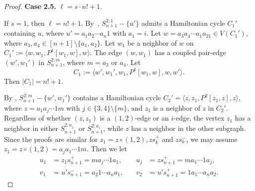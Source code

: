 \documentclass[12pt,a4paper]{amsart}
\theoremstyle{definition}
\begin{document}
\begin{proof}
%

\textbf{Case 2.5.} $\ell=s\cdot n!+1$.

If $s = 1$, then $\ell = n! + 1$. By~\cite[Lemma 2.8 (i)]{Li25}, $S_{n+1}^{2:1} - \{u'\}$ admits a Hamiltonian cycle $C_1'$ containing $u$, where $u'=a_1a_2\cdots a_n1$ with $a_1=i$. Let $w = a_3a_4\cdots a_1a_21\in V(C_1')$, where $a_3,a_4\in [n+1]\setminus\{a_1,a_2\}$. Let $w_1$ be a neighbor of $w$ on $C_1':=\langle w,w_1,P^1[w_1,w],w\rangle$. The edge $(w,w_1)$ has a coupled pair-edge $(w', w_1')$ in $S_{n+1}^{2:m}$, where $m = a_3$ or $a_4$. Let
\[
C_1 := \langle w', w_1', w_1, P^1[w_1, w], w, w' \rangle.
\]
Then $|C_1|=n!+1$.

By \cite[Lemma 2.8 (ii) and (iii)]{Li25}, $S_{n+1}^{2:m} - \{w', w_1'\}$ contains a Hamiltonian cycle $C_2' = \langle z, z_1, P^2[z_1,z], z \rangle$, where $z = a_1 a_j \cdots 1 m$ with $j \in \{3, 4\} \setminus \{m\}$, and $z_1$ is a neighbor of $z$ in $C_2'$.
Regardless of whether $(z, z_1)$ is a $(1,2)$-edge or an $i$-edge, the vertex $z_1$ has a neighbor in either $S_{n+1}^{2:a_j}$ or $S_{n+1}^{2:a_1}$, while $z$ has a neighbor in the other subgraph. Since the proofs are similar for $z_1=z\circ(1,2),zs_{k}^+$ and $zs_{k}^-$, we may assume $z_1=z\circ(1,2)=a_ja_1\cdots1m$. Then we let
\[
\begin{aligned}
u_1 &= z_1s_{n+1}^+ = m a_j \cdots 1 a_1, &\quad
u_j &= zs_{n+1}^+ =  m a_1\cdots 1 a_j,\\
v_1 &= u' s_{n+1}^- = a_2 1 \cdots a_n a_1, &\quad
v_2 &= u' s_{n+1}^+ = 1 a_1 \cdots a_n a_2.
\end{aligned}
\]


\end{proof}
\end{document}
